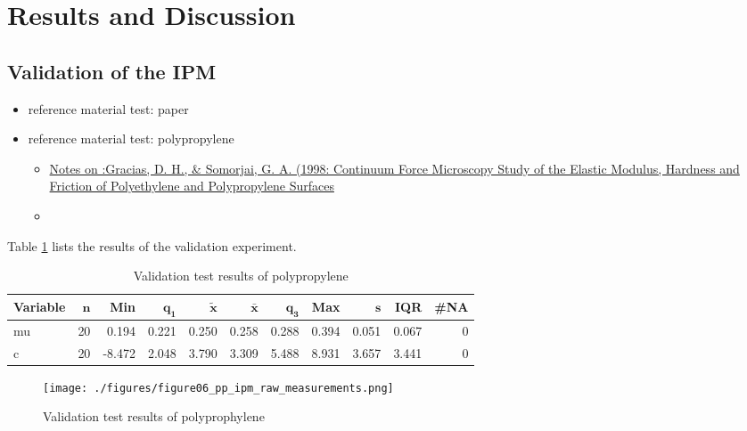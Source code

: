 \documentclass[xcolor=dvipsnames,10pt,hidelinks]{article}
\let\oldsubsection\subsection
\renewcommand{\subsection}{\clearpage\oldsubsection}
\begin{document}
\section{Results and Discussion}
\label{sec:org850b695}
\subsection{Validation of the IPM}
\label{sec:org35363fd}
\begin{itemize}
\item reference material test: paper
\item reference material test: polypropylene
\begin{itemize}
\item \parencite{gracias_continuum_1998}\href{../../../../../org/mindmap/gracias_continuum_1998.org}{Notes on :Gracias, D. H., \& Somorjai, G. A. (1998: Continuum Force Microscopy Study of the Elastic Modulus, Hardness and Friction of Polyethylene and Polypropylene Surfaces}
\item 
\end{itemize}
\end{itemize}

Table \ref{orgbda7082} lists the results of the validation experiment.

\begin{table}
  \begingroup\footnotesize
  \begin{longtable}{lrrrrrrrrrr}
    \textbf{Variable} & $\mathbf{n}$ & \textbf{Min} & $\mathbf{q_1}$ & $\mathbf{\widetilde{x}}$ & $\mathbf{\bar{x}}$ & $\mathbf{q_3}$ & \textbf{Max} & $\mathbf{s}$ & \textbf{IQR} & \textbf{\#NA} \\
    \hline
    mu & 20 &  0.194 & 0.221 & 0.250 & 0.258 & 0.288 & 0.394 & 0.051 & 0.067 & 0 \\
    c & 20 & -8.472 & 2.048 & 3.790 & 3.309 & 5.488 & 8.931 & 3.657 & 3.441 & 0 \\
    \hline
  \end{longtable}
  \endgroup
\caption{\label{orgbda7082}Validation test results of polypropylene}
\end{table}

\begin{figure}[htbp]
\centering
\texttt{[image: ./figures/figure06\_pp\_ipm\_raw\_measurements.png]}
\caption{\label{fig:org588ea98}Validation test results of polyprophylene}
\end{figure}
\end{document}

